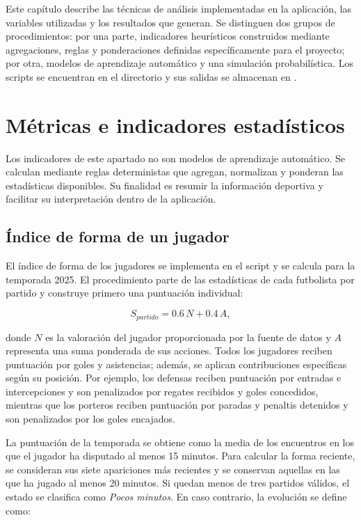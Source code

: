 Este capítulo describe las técnicas de análisis implementadas en la aplicación, las variables utilizadas y los resultados que generan. Se distinguen dos grupos de procedimientos: por una parte, indicadores heurísticos construidos mediante agregaciones, reglas y ponderaciones definidas específicamente para el proyecto; por otra, modelos de aprendizaje automático y una simulación probabilística. Los scripts se encuentran en el directorio  y sus salidas se almacenan en .

\section{Métricas e indicadores estadísticos}

Los indicadores de este apartado no son modelos de aprendizaje automático. Se calculan mediante reglas deterministas que agregan, normalizan y ponderan las estadísticas disponibles. Su finalidad es resumir la información deportiva y facilitar su interpretación dentro de la aplicación.

\subsection{Índice de forma de un jugador}

El índice de forma de los jugadores se implementa en el script  y se calcula para la temporada 2025. El procedimiento parte de las estadísticas de cada futbolista por partido y construye primero una puntuación individual:

\begin{equation}
    S_{partido}=0.6\,N+0.4\,A,
\end{equation}

donde $N$ es la valoración del jugador proporcionada por la fuente de datos y $A$ representa una suma ponderada de sus acciones. Todos los jugadores reciben puntuación por goles y asistencias; además, se aplican contribuciones específicas según su posición. Por ejemplo, los defensas reciben puntuación por entradas e intercepciones y son penalizados por regates recibidos y goles concedidos, mientras que los porteros reciben puntuación por paradas y penaltis detenidos y son penalizados por los goles encajados.

La puntuación de la temporada se obtiene como la media de los encuentros en los que el jugador ha disputado al menos 15 minutos. Para calcular la forma reciente, se consideran sus siete apariciones más recientes y se conservan aquellas en las que ha jugado al menos 20 minutos. Si quedan menos de tres partidos válidos, el estado se clasifica como \textit{Pocos minutos}. En caso contrario, la evolución se define como:

